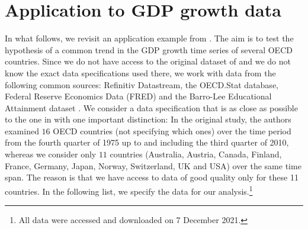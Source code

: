\documentclass[12pt]{article}
\begin{document}
\section{Application to GDP growth data}\label{sec:app:gdp}


In what follows, we revisit an application example from \cite{Zhang2012}. The aim is to test the hypothesis of a common trend in the GDP growth time series of several OECD countries. Since we do not have access to the original dataset of \cite{Zhang2012} and we do not know the exact data specifications used there, we work with data from the following common sources: Refinitiv Datastream, the OECD.Stat database, Federal Reserve Economics Data (FRED) and the Barro-Lee Educational Attainment dataset \citep*{Barro2013}. We consider a data specification that is as close as possible to the one in \cite{Zhang2012} with one important distinction: In the original study, the authors examined $16$ OECD countries (not specifying which ones) over the time period from the fourth quarter of 1975 up to and including the third quarter of 2010, whereas we consider only $11$ countries (Australia, Austria, Canada, Finland, France, Germany, Japan, Norway, Switzerland, UK and USA) over the same time span. The reason is that we have access to data of good quality only for these 11 countries. 
In the following list, we specify the data for our analysis.\footnote{All data were accessed and downloaded on 7 December 2021.}
\end{document}
